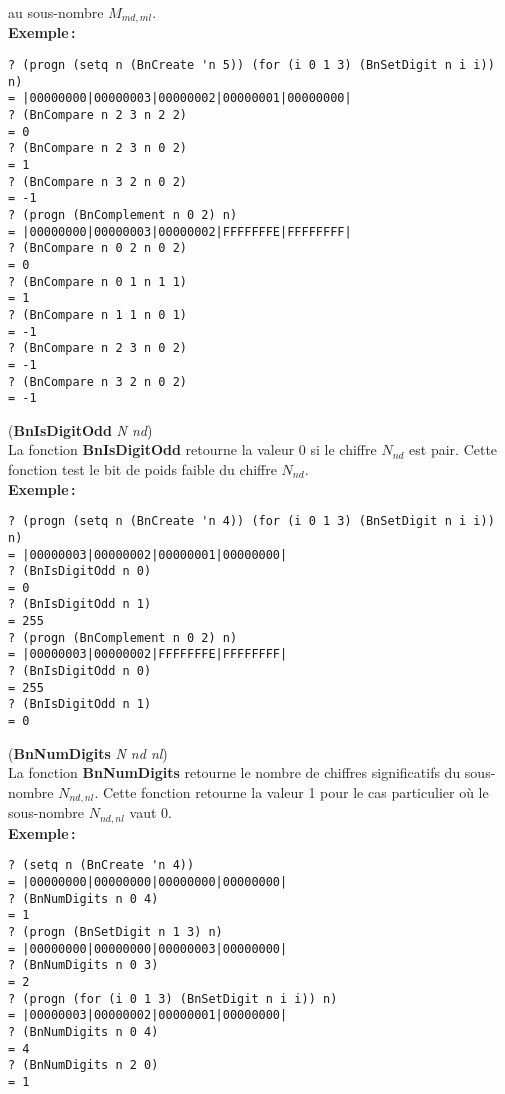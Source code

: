 au sous-nombre $M_{md,ml}$.
\\[18pt]
{\bf Exemple\,:}
\begin{verbatim}
? (progn (setq n (BnCreate 'n 5)) (for (i 0 1 3) (BnSetDigit n i i)) n)
= |00000000|00000003|00000002|00000001|00000000|
? (BnCompare n 2 3 n 2 2)
= 0
? (BnCompare n 2 3 n 0 2)
= 1
? (BnCompare n 3 2 n 0 2)
= -1
? (progn (BnComplement n 0 2) n)
= |00000000|00000003|00000002|FFFFFFFE|FFFFFFFF|
? (BnCompare n 0 2 n 0 2)
= 0
? (BnCompare n 0 1 n 1 1)
= 1
? (BnCompare n 1 1 n 0 1)
= -1
? (BnCompare n 2 3 n 0 2)
= -1
? (BnCompare n 3 2 n 0 2)
= -1
\end{verbatim}
\vspace*{24pt}
({\bf BnIsDigitOdd} {\em N nd})
\\[12pt]
La fonction {\bf BnIsDigitOdd} retourne la valeur 0 si le chiffre $N_{nd}$
est pair. Cette fonction test le bit de poids faible du chiffre $N_{nd}$.
\\[18pt]
{\bf Exemple\,:}
\begin{verbatim}
? (progn (setq n (BnCreate 'n 4)) (for (i 0 1 3) (BnSetDigit n i i)) n)
= |00000003|00000002|00000001|00000000|
? (BnIsDigitOdd n 0)
= 0
? (BnIsDigitOdd n 1)
= 255
? (progn (BnComplement n 0 2) n)
= |00000003|00000002|FFFFFFFE|FFFFFFFF|
? (BnIsDigitOdd n 0)
= 255
? (BnIsDigitOdd n 1)
= 0
\end{verbatim}
\vspace*{24pt}
({\bf BnNumDigits} {\em N nd nl})
\\[12pt]
La fonction {\bf BnNumDigits} retourne le nombre de chiffres significatifs du
sous-nombre $N_{nd,nl}$. Cette fonction retourne la valeur 1 pour le
cas particulier o\`u le sous-nombre $N_{nd,nl}$ vaut 0.
\\[18pt]
{\bf Exemple\,:}
\begin{verbatim}
? (setq n (BnCreate 'n 4))
= |00000000|00000000|00000000|00000000|
? (BnNumDigits n 0 4)
= 1
? (progn (BnSetDigit n 1 3) n)
= |00000000|00000000|00000003|00000000|
? (BnNumDigits n 0 3)
= 2
? (progn (for (i 0 1 3) (BnSetDigit n i i)) n)
= |00000003|00000002|00000001|00000000|
? (BnNumDigits n 0 4)
= 4
? (BnNumDigits n 2 0)
= 1
\end{verbatim}
\vspace*{15pt}

